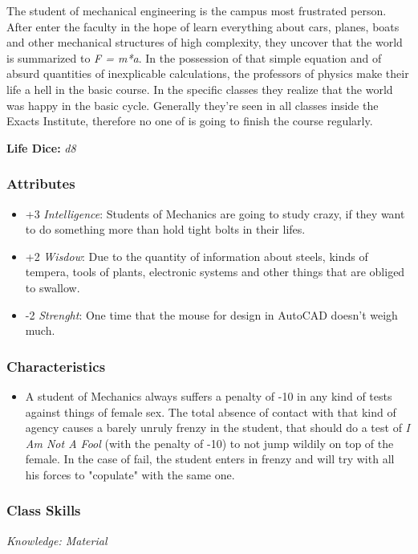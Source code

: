 \documentclass[ letterpaper,12pt]{article}
\begin{document}
The student of mechanical engineering is the campus most frustrated person. After enter the faculty in the hope of learn everything about cars, planes, boats and other mechanical structures of high complexity, they uncover that the world is summarized to {\it F = m*a}. In the possession of that simple equation and of absurd quantities of inexplicable calculations, the professors of physics make their life a hell in the basic course. In the specific classes they realize that the world was happy in the basic cycle. Generally they're seen in all classes inside the Exacts Institute, therefore no one of is going to finish the course regularly.

{\bf Life Dice: } {\it d8}

\subsubsection{Attributes}
\begin{itemize}
\item{+3 {\it Intelligence}: Students  of Mechanics are going to study crazy, if they want to  do something more than  hold tight bolts in their lifes.}
\item{+2 {\it Wisdow}: Due  to the quantity of information about steels,  kinds  of   tempera,   tools  of plants,  electronic   systems  and  other things that  are  obliged to swallow.}
\item{-2 {\it Strenght}: One  time that the  mouse  for  design  in  AutoCAD doesn't weigh much.}
\end{itemize}


\subsubsection{Characteristics}
\begin{itemize}
\item{A  student  of Mechanics always suffers a penalty of  -10  in  any  kind  of  tests against things of female sex.  The  total absence  of  contact  with  that  kind of agency causes a  barely unruly  frenzy in the  student,  that  should  do a test of {\it I Am Not A Fool} (with the penalty of -10) to not jump wildily on top of the female. In the  case  of fail, the student enters in  frenzy  and  will  try  with  all his forces to "copulate" with the same one.}
\end{itemize}

\subsubsection{Class Skills}
{\it Knowledge: Material}
\end{document}
